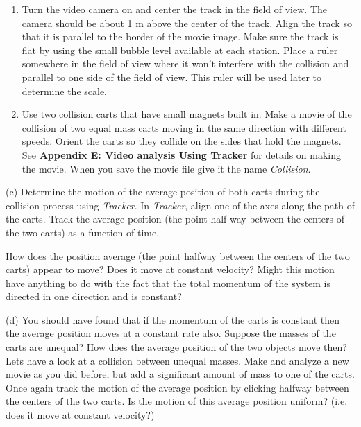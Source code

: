\begin{enumerate}
\item Turn the video camera on and center the track in the field of view. The camera
should be about 1 m above the center of the track. Align the track so that it
is parallel to the border of the movie image. Make sure the track is flat by
using the small bubble level available at each station. Place a ruler somewhere in
the field of view where it won't interfere with the collision and parallel to
one side of the field of view. This ruler will be used later to determine the
scale. 
\item Use two collision carts that have small magnets built in. Make a movie of the
collision of two equal mass carts moving in the same direction with different
speeds. Orient the carts so they collide on the sides that hold the magnets.
See \textbf{Appendix E: Video analysis Using Tracker} for details on making the movie. When
you save the movie file give it the name \textit{Collision}. 
\end{enumerate}
(c) Determine the motion of the average position of both carts during the collision process 
using \textit{Tracker}. In \textit{Tracker}, align one of the axes along the path of the carts. 
Track the average position (the point half way between the centers of the two carts) as a function 
of time.

\newpage

How does the position average (the point halfway between the centers of the two carts) appear to move? Does it move at constant velocity? Might this motion have anything to do with the fact that the total momentum of the system is directed in one direction and is constant?
\vspace{40mm}

(d) You should have found that if the momentum of the carts is constant then
the average position moves at a constant rate also. Suppose the masses of the
carts are unequal? How does the average position of the two objects move then?
Lets have a look at a collision between unequal masses. Make and analyze a new
movie as you did before, but add a significant amount of mass to one of the
carts. Once again track the motion of the average position by clicking halfway
between the centers of the two carts. Is the motion of this average position
uniform? (i.e. does it move at constant velocity?)
\vspace{40mm}

